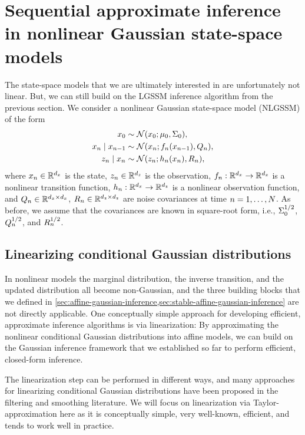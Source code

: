 \documentclass{mimosis}
\begin{document}
\section{Sequential approximate inference in nonlinear Gaussian state-space models}
\label{sec:orgba2d3eb}
\label{sec:nlgssm-inference}
The state-space models that we are ultimately interested in are unfortunately not linear.
But, we can still build on the LGSSM inference algorithm from the previous section.
We consider a nonlinear Gaussian state-space model (NLGSSM) of the form
\begin{subequations}
\label{eq:nlgssm}
\begin{align}
\st_0 &\sim \N( \st_0; \mean{0}, \cov{0} ), \\
\st_\idxt \mid \st_{\idxt-1} &\sim \N( \st_\idxt; \transf_\idxt(\st_{\idxt-1}), \transC_\idxt ), \\
\obs_\idxt \mid \st_\idxt &\sim \N( \obs_\idxt; \obsh_\idxt(\st_\idxt), \obsC_\idxt),
\end{align}
\end{subequations}
where
\(x_n \in \mathbb{R}^{d_x}\) is the state,
\(z_n \in \mathbb{R}^{d_z}\) is the observation,
\(f_n : \mathbb{R}^{d_x} \to \mathbb{R}^{d_x}\) is a nonlinear transition function,
\(h_n : \mathbb{R}^{d_x} \to \mathbb{R}^{d_z}\) is a nonlinear observation function,
and \(Q_n \in \mathbb{R}^{d_x \times d_x}\), \(R_n \in \mathbb{R}^{d_z \times d_z}\) are noise covariances
at time \(n = 1, \dots, N\).
As before, we assume that the covariances are known in square-root form, i.e., \(\Sigma_{0}^{1/2}\), \(Q_n^{1/2}\), and \(R_n^{1/2}\).
\subsection{Linearizing conditional Gaussian distributions}
\label{sec:org4ca1fc6}
\label{sec:linearization}
In nonlinear models the marginal distribution, the inverse transition, and the updated distribution all become non-Gaussian,
and the three building blocks that we defined in
\cref{sec:affine-gaussian-inference,sec:stable-affine-gaussian-inference}
are not directly applicable.
One conceptually simple approach for developing efficient, approximate inference algorithms is via linearization:
By approximating the nonlinear conditional Gaussian distributions into affine models, we can build on the Gaussian inference framework that we established so far to perform efficient, closed-form inference.

The linearization step can be performed in different ways, and many approaches for linearizing conditional Gaussian distributions have been proposed in the filtering and smoothing literature.
We will focus on linearization via Taylor-approximation here as it is conceptually simple, very well-known, efficient, and tends to work well in practice.
\end{document}
